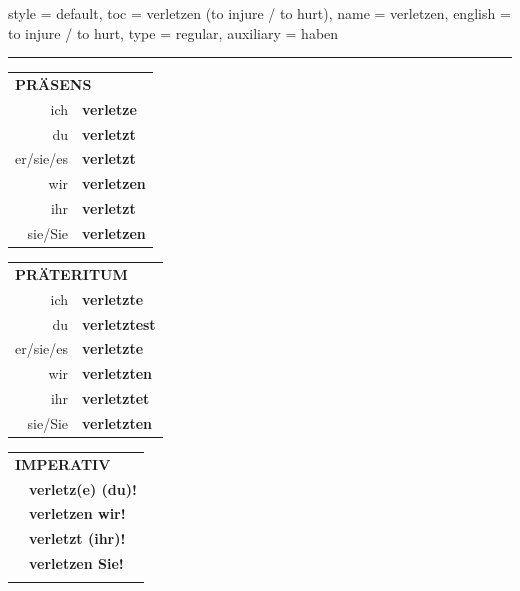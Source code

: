 \begin{verbentry}{
  style = {default},
  toc = {verletzen (to injure / to hurt)},
  name = {verletzen},
  english = {to injure / to hurt},
  type = {regular},
  auxiliary = {haben}
}
 
    
     \vspace{5pt}

    \hrule
    
    \vspace{5pt}

  \begin{tabular}{rl}
     \multicolumn{2}{l}{\textbf{PRÄSENS} }\\
    ich & \textbf{verletze}\\
    du & \textbf{verletzt}\\
    er/sie/es & \textbf{verletzt}\\
    wir & \textbf{verletzen}\\
    ihr & \textbf{verletzt}\\
    sie/Sie & \textbf{verletzen}\\
  \end{tabular}
  \hfill
     \begin{tabular}{rl}
    \multicolumn{2}{l}{\textbf{PRÄTERITUM} }\\
    ich & \textbf{verletzte}\\
    du & \textbf{verletztest}\\
    er/sie/es & \textbf{verletzte}\\
    wir & \textbf{verletzten}\\
    ihr & \textbf{verletztet}\\
    sie/Sie & \textbf{verletzten}\\
  \end{tabular}
  \hfill
  \begin{tabular}{rl}
     \multicolumn{2}{l}{\textbf{IMPERATIV} }\\
   & \textbf{verletz(e) (du)!}\\
   & \textbf{verletzen wir!}\\
   & \textbf{verletzt (ihr)!}\\
   & \textbf{verletzen Sie!}\\
   & \vspace{10pt}
  \end{tabular}

    \vspace{10pt}


\end{verbentry}
